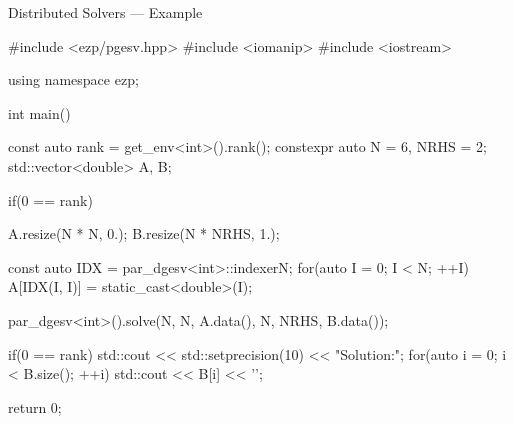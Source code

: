 \documentclass[fleqn,10pt]{beamer}
\begin{document}
\begin{frame}[containsverbatim]{Distributed Solvers --- Example}
\begin{cppcode}[fontsize=\tiny,highlightlines={13-17,20}]
#include <ezp/pgesv.hpp>
#include <iomanip>
#include <iostream>

using namespace ezp;

int main() {
    const auto rank = get_env<int>().rank();
    constexpr auto N = 6, NRHS = 2;
    std::vector<double> A, B;

    if(0 == rank) {
        A.resize(N * N, 0.);
        B.resize(N * NRHS, 1.);

        const auto IDX = par_dgesv<int>::indexer{N};
        for(auto I = 0; I < N; ++I) A[IDX(I, I)] = static_cast<double>(I);
    }

    par_dgesv<int>().solve({N, N, A.data()}, {N, NRHS, B.data()});

    if(0 == rank) {
        std::cout << std::setprecision(10) << "Solution:\n";
        for(auto i = 0; i < B.size(); ++i) std::cout << B[i] << '\n';
    }

    return 0;
}
\end{cppcode}
\end{frame}
\end{document}
